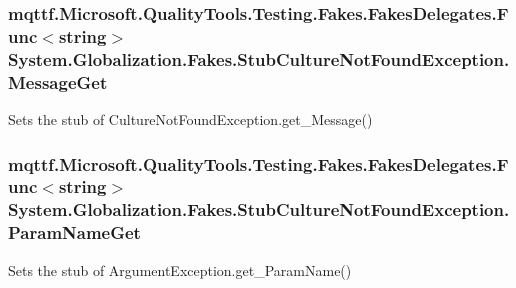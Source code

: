 \hypertarget{class_system_1_1_globalization_1_1_fakes_1_1_stub_culture_not_found_exception_ac6b9ffea37c4eb3e1cc53471d0ad76ad}{
\subsubsection[{Message\-Get}]{\setlength{\rightskip}{0pt plus 5cm}mqttf.\-Microsoft.\-Quality\-Tools.\-Testing.\-Fakes.\-Fakes\-Delegates.\-Func$<$string$>$ System.\-Globalization.\-Fakes.\-Stub\-Culture\-Not\-Found\-Exception.\-Message\-Get}}\label{class_system_1_1_globalization_1_1_fakes_1_1_stub_culture_not_found_exception_ac6b9ffea37c4eb3e1cc53471d0ad76ad}


Sets the stub of Culture\-Not\-Found\-Exception.\-get\-\_\-\-Message()

\hypertarget{class_system_1_1_globalization_1_1_fakes_1_1_stub_culture_not_found_exception_ad77d9ee540c3f9f373bbb1f087fefcd7}{
\subsubsection[{Param\-Name\-Get}]{\setlength{\rightskip}{0pt plus 5cm}mqttf.\-Microsoft.\-Quality\-Tools.\-Testing.\-Fakes.\-Fakes\-Delegates.\-Func$<$string$>$ System.\-Globalization.\-Fakes.\-Stub\-Culture\-Not\-Found\-Exception.\-Param\-Name\-Get}}\label{class_system_1_1_globalization_1_1_fakes_1_1_stub_culture_not_found_exception_ad77d9ee540c3f9f373bbb1f087fefcd7}


Sets the stub of Argument\-Exception.\-get\-\_\-\-Param\-Name()

